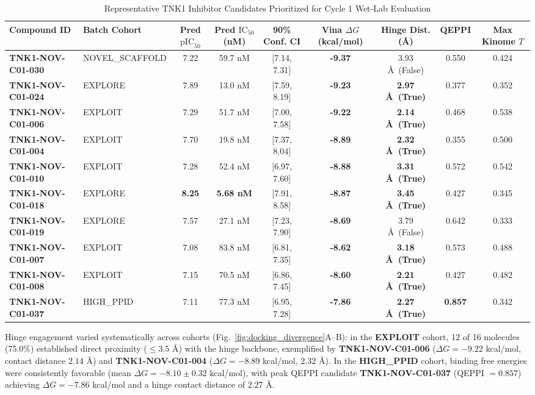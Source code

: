 \documentclass[journal]{IEEEtran}
\begin{document}
\begin{table}[!t]
\caption{Representative TNK1 Inhibitor Candidates Prioritized for Cycle 1 Wet-Lab Evaluation}
\label{tab:top_leads}
\centering
\begin{tabular}{llccccccc}
\toprule
\textbf{Compound ID} & \textbf{Batch Cohort} & \textbf{Pred $\text{pIC}_{50}$} & \textbf{Pred $\text{IC}_{50}$ (nM)} & \textbf{90\% Conf. CI} & \textbf{Vina $\Delta G$ (kcal/mol)} & \textbf{Hinge Dist. (\AA)} & \textbf{QEPPI} & \textbf{Max Kinome $T$} \\
\midrule
\textbf{TNK1-NOV-C01-030} & NOVEL\_SCAFFOLD & 7.22 & 59.7 nM & [7.14, 7.31] & \textbf{-9.37} & 3.93 \AA\ (False) & 0.550 & 0.424 \\
\textbf{TNK1-NOV-C01-024} & EXPLORE & 7.89 & 13.0 nM & [7.59, 8.19] & \textbf{-9.23} & \textbf{2.97 \AA\ (True)} & 0.377 & 0.352 \\
\textbf{TNK1-NOV-C01-006} & EXPLOIT & 7.29 & 51.7 nM & [7.00, 7.58] & \textbf{-9.22} & \textbf{2.14 \AA\ (True)} & 0.468 & 0.538 \\
\textbf{TNK1-NOV-C01-004} & EXPLOIT & 7.70 & 19.8 nM & [7.37, 8.04] & \textbf{-8.89} & \textbf{2.32 \AA\ (True)} & 0.355 & 0.500 \\
\textbf{TNK1-NOV-C01-010} & EXPLOIT & 7.28 & 52.4 nM & [6.97, 7.60] & \textbf{-8.88} & \textbf{3.31 \AA\ (True)} & 0.572 & 0.542 \\
\textbf{TNK1-NOV-C01-018} & EXPLORE & \textbf{8.25} & \textbf{5.68 nM} & [7.91, 8.58] & \textbf{-8.87} & \textbf{3.45 \AA\ (True)} & 0.427 & 0.345 \\
\textbf{TNK1-NOV-C01-019} & EXPLORE & 7.57 & 27.1 nM & [7.23, 7.90] & \textbf{-8.69} & 3.79 \AA\ (False) & 0.642 & 0.333 \\
\textbf{TNK1-NOV-C01-007} & EXPLOIT & 7.08 & 83.8 nM & [6.81, 7.35] & \textbf{-8.62} & \textbf{3.18 \AA\ (True)} & 0.573 & 0.488 \\
\textbf{TNK1-NOV-C01-008} & EXPLOIT & 7.15 & 70.5 nM & [6.86, 7.45] & \textbf{-8.60} & \textbf{2.21 \AA\ (True)} & 0.427 & 0.482 \\
\textbf{TNK1-NOV-C01-037} & HIGH\_PPID & 7.11 & 77.3 nM & [6.95, 7.28] & \textbf{-7.86} & \textbf{2.27 \AA\ (True)} & \textbf{0.857} & 0.342 \\
\bottomrule
\end{tabular}
\end{table}

Hinge engagement varied systematically across cohorts (Fig.~\ref{fig:docking_divergence}A--B): in the \textbf{EXPLOIT} cohort, 12 of 16 molecules (75.0\%) established direct proximity ($\le 3.5\text{ \AA}$) with the hinge backbone, exemplified by \textbf{TNK1-NOV-C01-006} ($\Delta G = -9.22$ kcal/mol, contact distance $2.14\text{ \AA}$) and \textbf{TNK1-NOV-C01-004} ($\Delta G = -8.89$ kcal/mol, $2.32\text{ \AA}$). In the \textbf{HIGH\_PPID} cohort, binding free energies were consistently favorable (mean $\Delta G = -8.10 \pm 0.32$ kcal/mol), with peak QEPPI candidate \textbf{TNK1-NOV-C01-037} (QEPPI $= 0.857$) achieving $\Delta G = -7.86$ kcal/mol and a hinge contact distance of $2.27\text{ \AA}$.
\end{document}

